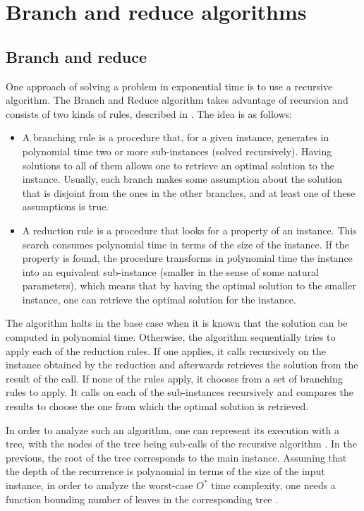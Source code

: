 \section{Branch and reduce algorithms}
\subsection{Branch and reduce} \label{branch_and_reduce}
One approach of solving a problem in exponential time is to use a recursive algorithm. The Branch and Reduce algorithm takes advantage of recursion and consists of two kinds of rules, described in \cite{DBLP:journals/eatcs/FominGK05}. The idea is as follows:
\begin{itemize}
    \item A branching rule is a procedure that, for a given instance, generates in polynomial time two or more sub-instances (solved recursively). Having solutions to all of them allows one to retrieve an optimal solution to the instance. Usually, each branch makes some assumption about the solution that is disjoint from the ones in the other branches, and at least one of these assumptions is true. 
    \item A reduction rule is a procedure that looks for a property of an instance. This search consumes polynomial time in terms of the size of the instance. If the property is found, the procedure transforms in polynomial time the instance into an equivalent sub-instance (smaller in the sense of some natural parameters), which means that by having the optimal solution to the smaller instance, one can retrieve the optimal solution for the instance.
\end{itemize}

The algorithm halts in the base case when it is known that the solution can be computed in polynomial time. Otherwise, the algorithm sequentially tries to apply each of the reduction rules. If one applies, it calls recursively on the instance obtained by the reduction and afterwards retrieves the solution from the result of the call. If none of the rules apply, it chooses from a set of branching rules to apply. It calls on each of the sub-instances recursively and compares the results to choose the one from which the optimal solution is retrieved.
\par In order to analyze such an algorithm, one can represent its execution with a tree, with the nodes of the tree being sub-calls of the recursive algorithm \cite{DBLP:journals/eatcs/FominGK05}. In the previous, the root of the tree corresponds to the main instance. Assuming that the depth of the recurrence is polynomial in terms of the size of the input instance, in order to analyze the worst-case $O^*$ time complexity, one needs a function bounding number of leaves in the corresponding tree \cite{VANROOIJ20112147}.\par
